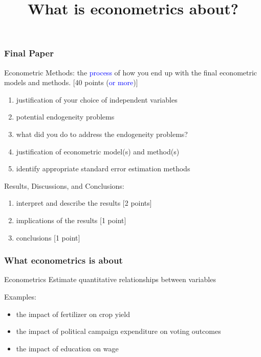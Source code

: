 \documentclass[fleqn]{beamer}\usepackage[]{graphicx}\usepackage[]{color}
\begin{document}
\begin{frame}[c]
  \frametitle{Final Paper}
  \begin{block}{Econometric Methods:}
    the \textcolor{blue}{process} of how you end up with the final econometric models and methods. [40 points (\textcolor{blue}{or more})]
    \begin{enumerate}
      \item justification of your choice of independent variables
      \item potential endogeneity problems
      \item what did you do to address the endogeneity problems?
      \item justification of econometric model(s) and method(s)
      \item identify appropriate standard error estimation methods
    \end{enumerate}
  \end{block}
  \begin{block}{Results, Discussions, and Conclusions:}
    \begin{enumerate}
        \item interpret and describe the results [2 points]
        \item implications of the results [1 point]
        \item conclusions [1 point]
     \end{enumerate}
  \end{block}
\end{frame}

\title{What is econometrics about?}
\author{}
\date{}
\everymath{\displaystyle}

\begin{frame}
\titlepage
\end{frame}

\begin{frame}[c]
  \frametitle{What econometrics is about}
  \begin{block}{Econometrics}
     Estimate quantitative relationships between variables
  \end{block}
  \begin{block}{Examples:}
    \begin{itemize}
      \item the impact of fertilizer on crop yield
      \item the impact of political campaign expenditure on voting outcomes
      \item the impact of education on wage
    \end{itemize}
  \end{block}
\end{frame}
\end{document}
